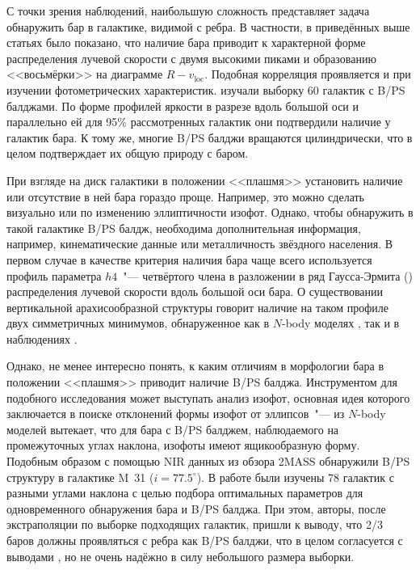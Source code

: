 \documentclass{trlnotes}
\begin{document}
С точки зрения наблюдений,
наибольшую сложность представляет задача обнаружить бар в галактике, видимой с ребра. В частности, в приведённых выше статьях
было показано, что наличие бара приводит к характерной форме распределения лучевой скорости с двумя высокими пиками и образованию  <<восьмёрки>> на диаграмме $R - v_{\text{loc}}$. 
Подобная корреляция проявляется и при изучении фотометрических характеристик. \citet{lutticke2000a} изучали выборку 60 галактик с B/PS балджами. По форме
профилей яркости в разрезе вдоль большой оси и параллельно ей для 95\% рассмотренных галактик они  подтвердили наличие у галактик бара. 
К тому же, многие B/PS балджи вращаются цилиндрически, что в целом подтверждает их общую природу с баром. 
 
При взгляде на диск галактики в положении <<плашмя>> установить наличие или отсутствие в ней бара гораздо проще. Например, это можно сделать визуально или по изменению эллиптичности изофот. Однако, чтобы обнаружить в такой галактике B/PS балдж, необходима дополнительная информация, например, кинематические данные или металличность звёздного населения. В первом случае в качестве критерия наличия бара чаще всего используется профиль параметра
$h4$~"---  четвёртого члена в разложении в ряд Гаусса-Эрмита (\cite{vandermarel1993}) распределения лучевой
скорости вдоль большой оси бара. 
О существовании вертикальной арахисообразной структуры говорит наличие на таком профиле двух симметричных минимумов, обнаруженное как в $N$-body моделях \citep{debattista2005,iannuzzi2015}, так и в наблюдениях \citep{mendez-abreu2008}.

Однако, не менее интересно понять, к каким отличиям в морфологии бара в положении  <<плашмя>> приводит наличие B/PS балджа. 
Инструментом для подобного исследования может выступать анализ изофот, основная идея которого заключается в поиске
отклонений формы изофот от эллипсов~"--- из $N$-body моделей вытекает, что для бара с B/PS балджем,
наблюдаемого на промежуточных углах наклона, изофоты имеют ящикообразную форму. Подобным образом с помощью NIR данных из обзора 2MASS  \citet{beaton2007} обнаружили B/PS структуру в галактике M~31 ($i = 77.5^\circ$). В работе \citet{erwin2013} были изучены 78 галактик с разными углами наклона с целью подбора оптимальных параметров для
одновременного обнаружения бара и B/PS балджа. При этом, авторы, после экстраполяции по выборке
подходящих галактик, пришли к выводу, что 2/3 баров должны проявляться с ребра как B/PS балджи, что в
целом согласуется с выводами \citet{lutticke2000a}, но не очень надёжно в силу небольшого размера выборки.
\end{document}
